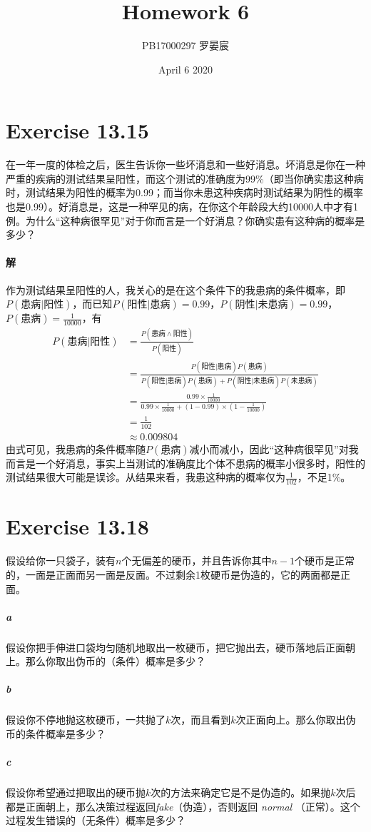 \documentclass{article}
\title{Homework 6}
\author{PB17000297 罗晏宸}
\date{April 6 2020}
\begin{document}
\maketitle

\section{Exercise 13.15}
在一年一度的体检之后，医生告诉你一些坏消息和一些好消息。坏消息是你在一种严重的疾病的测试结果呈阳性，而这个测试的准确度为99\%（即当你确实患这种病时，测试结果为阳性的概率为0.99；而当你未患这种疾病时测试结果为阴性的概率也是0.99）。好消息是，这是一种罕见的病，在你这个年龄段大约10000人中才有1例。为什么“这种病很罕见”对于你而言是一个好消息？你确实患有这种病的概率是多少？

\paragraph{解}
作为测试结果呈阳性的人，我关心的是在这个条件下的我患病的条件概率，即$P(\text{患病}|\text{阳性})$，而已知$P(\text{阳性}|\text{患病}) = 0.99$，$P(\text{阴性}|\text{未患病}) = 0.99$，$P(\text{患病}) = \frac{1}{10000}$，有
\begin{align*}
    P(\text{患病}|\text{阳性}) & = \frac{P(\text{患病} \land \text{阳性})}{P(\text{阳性})}                                                                                  \\
                               & = \frac{P(\text{阳性}|\text{患病})P(\text{患病})}{P(\text{阳性}|\text{患病})P(\text{患病}) + P(\text{阴性}|\text{未患病})P(\text{未患病})} \\
                               & = \frac{0.99 \times \frac{1}{10000}}{0.99 \times \frac{1}{10000} + (1 - 0.99) \times (1 - \frac{1}{10000})}                                \\
                               & = \frac{1}{102}                                                                                                                            \\
                               & \approx 0.009804
\end{align*}
由式可见，我患病的条件概率随$P(\text{患病})$减小而减小，因此“这种病很罕见”对我而言是一个好消息，事实上当测试的准确度比个体不患病的概率小很多时，阳性的测试结果很大可能是误诊。从结果来看，我患这种病的概率仅为$\frac{1}{102}$，不足1\%。

\section{Exercise 13.18}
假设给你一只袋子，装有$n$个无偏差的硬币，并且告诉你其中$n - 1$个硬币是正常的，一面是正面而另一面是反面。不过剩余1枚硬币是伪造的，它的两面都是正面。
\subparagraph{a} 假设你把手伸进口袋均匀随机地取出一枚硬币，把它抛出去，硬币落地后正面朝上。那么你取出伪币的（条件）概率是多少？
\subparagraph{b} 假设你不停地抛这枚硬币，一共抛了$k$次，而且看到$k$次正面向上。那么你取出伪币的条件概率是多少？
\subparagraph{c} 假设你希望通过把取出的硬币抛$k$次的方法来确定它是不是伪造的。如果抛$k$次后都是正面朝上，那么决策过程返回\textit{fake}（伪造），否则返回 \textit{normal} （正常）。这个过程发生错误的（无条件）概率是多少？
\end{document}
